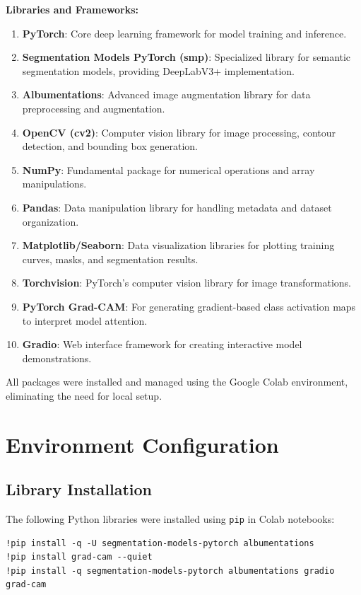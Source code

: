 \documentclass[a4paper,12pt]{report}
\begin{document}
\textbf{Libraries and Frameworks:}
\begin{enumerate}
    \item \textbf{PyTorch}: Core deep learning framework for model training and inference.
    \item \textbf{Segmentation Models PyTorch (smp)}: Specialized library for semantic segmentation models, providing DeepLabV3+ implementation.
    \item \textbf{Albumentations}: Advanced image augmentation library for data preprocessing and augmentation.
    \item \textbf{OpenCV (cv2)}: Computer vision library for image processing, contour detection, and bounding box generation.
    \item \textbf{NumPy}: Fundamental package for numerical operations and array manipulations.
    \item \textbf{Pandas}: Data manipulation library for handling metadata and dataset organization.
    \item \textbf{Matplotlib/Seaborn}: Data visualization libraries for plotting training curves, masks, and segmentation results.
    \item \textbf{Torchvision}: PyTorch's computer vision library for image transformations.
    \item \textbf{PyTorch Grad-CAM}: For generating gradient-based class activation maps to interpret model attention.
    \item \textbf{Gradio}: Web interface framework for creating interactive model demonstrations.
\end{enumerate}

All packages were installed and managed using the Google Colab environment, eliminating the need for local setup.




\section{Environment Configuration}

\subsection{Library Installation}

The following Python libraries were installed using \texttt{pip} in Colab notebooks:

\begin{verbatim}
!pip install -q -U segmentation-models-pytorch albumentations
!pip install grad-cam --quiet
!pip install -q segmentation-models-pytorch albumentations gradio grad-cam
\end{verbatim}
\end{document}
